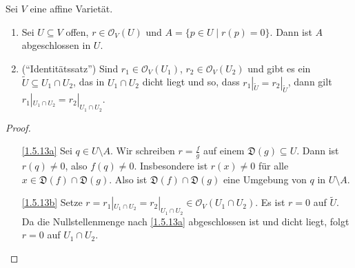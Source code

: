\documentclass[a4paper,12pt,index=toc]{scrbook}
\theoremstyle{keinenummern} %
\def\O{\mathcal{O}}
\newcommand{\D}{\mathfrak{D}}
\newcommand{\restrict}[1]{|_{#1}}
\newcommand{\schlange}[1]{\widetilde{#1}}
\begin{document}
\begin{bem}\label{1.5.13}
  Sei $V$ eine affine Varietät.
  \begin{enumerate}
  \item{} Sei $U\subseteq V$ offen, $r\in\O_V(U)$ und $A=\{p\in U\mid r(p)=0\}$. Dann ist $A$ abgeschlossen in $U$.
  \item{} (\enquote{Identitätssatz}) Sind $r_1\in\O_V(U_1)$, $r_2\in\O_V(U_2)$ und gibt es ein $\schlange{U}\subseteq
    U_1\cap U_2$, das in $U_1\cap U_2$ dicht liegt und so, dass $r_1\restrict{\schlange{U}}=r_2\restrict{\schlange{U}}$, dann gilt
    $r_1\restrict{U_1\cap U_2}=r_2\restrict{U_1\cap U_2}$.
  \end{enumerate}
\end{bem}
\begin{proof}
  \begin{enumerate}
  \item[\ref{1.5.13a}] Sei $q\in U\setminus A$. Wir schreiben $r=\frac{f}{g}$ auf einem $\D(g)\subseteq U$. Dann ist $r(q)\neq0$,
    also $f(q)\neq0$. Insbesondere ist $r(x)\neq0$ für alle $x\in \D(f)\cap \D(g)$. Also ist $\D(f)\cap \D(g)$ eine Umgebung von $q$
    in $U\setminus A$.
  \item[\ref{1.5.13b}] Setze $r=r_1\restrict{U_1\cap U_2}=r_2\restrict{U_1\cap U_2}\in \O_V(U_1\cap U_2)$. Es ist $r=0$ auf
    $\schlange{U}$. Da die Nullstellenmenge nach \ref{1.5.13a} abgeschlossen ist und dicht liegt, folgt $r=0$ auf $U_1\cap U_2$.
  \end{enumerate}
\end{proof}
\end{document}

